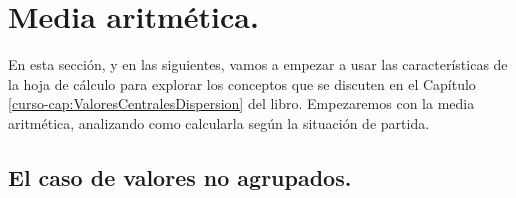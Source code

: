 \documentclass[10pt,a4paper]{article}\usepackage[]{graphicx}\usepackage[]{color}
\begin{document}
\section{Media aritmética.}
\label{tut01:sec:mediaAritmeticaHojaCalculo}

En esta sección, y en las siguientes, vamos a empezar a usar las características de la hoja de cálculo para explorar los conceptos que se discuten en el Capítulo \ref{curso-cap:ValoresCentralesDispersion} del libro. Empezaremos con la media aritmética, analizando como calcularla según la situación de partida.

\subsection{El caso de valores no agrupados.}
\label{tut01:subsec:MediaAritmeticaCalculoDirecto}
\end{document}
